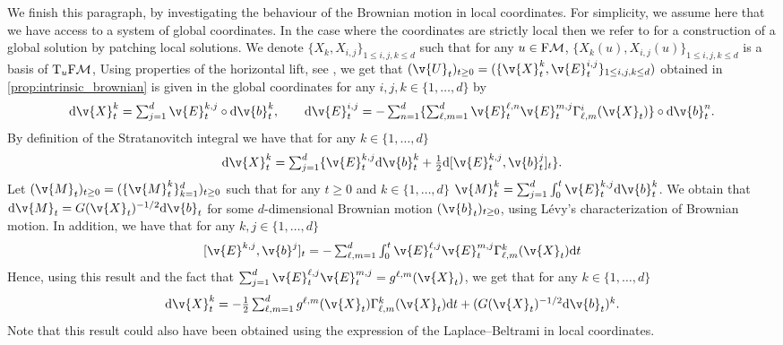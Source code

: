 We finish this paragraph, by investigating the behaviour of the Brownian motion in local coordinates.
For simplicity, we assume here that we have access to a system of global coordinates.
In the case where the coordinates are strictly local then we refer to \textcite[Chapter 5, Theorem 1]{ikeda1989sto} for a construction of a global solution by patching local solutions.
We denote $\{X_k, X_{i,j}\}_{1 \leq i,j,k \leq d}$ such that for any $u \in \mathrm{F}\mathcal{M}$, $\{X_k(u), X_{i,j}(u)\}_{1 \leq i,j,k \leq d}$ is a basis of $\mathrm{T}_u \mathrm{F}\mathcal{M}$, Using properties of the horizontal lift, see \cite[Chapter 2]{hsu2002stochastic}, we get that $(\v{U}_t)_{t \geq 0} = (\{\v{X}^k_t, \v{E}_t^{i,j}\}_{1 \leq i,j,k \leq d})$ obtained in \cref{prop:intrinsic_brownian} is given in the global coordinates for any $i,j,k \in \{1, \dots, d\}$ by \begin{equation} \textstyle{ \mathrm{d} \v{X}_t^k = \sum_{j=1}^d \v{E}_t^{k,j} \circ \mathrm{d} \v{b}_t^k , \qquad \mathrm{d} \v{E}_t^{i,j} = - \sum_{n=1}^d \{\sum_{\ell, m=1}^d \v{E}_t^{\ell,n}\v{E}_t^{m,j} \Gamma_{\ell,m}^{i}(\v{X}_t)\} \circ \mathrm{d} \v{b}_t^n .
	}
\end{equation}
By definition of the Stratanovitch integral we have that for any $k \in \{1, \dots, d\}$ \begin{equation} \textstyle{ \mathrm{d} \v{X}_t^k = \sum_{j=1}^d \{ \v{E}_t^{k,j} \mathrm{d} \v{b}_t^k +\tfrac{1}{2} \mathrm{d} [\v{E}_t^{k,j}, \v{b}_t^j]_t \} .
	}
\end{equation}
Let $(\v{M}_t)_{t \geq 0} = (\{\v{M}_t^k\}_{k=1}^d)_{t \geq 0}$ such that for any $t \geq 0$ and $k \in \{1, \dots, d\}$ $\v{M}_t^k = \sum_{j=1}^d \int_0^t \v{E}_t^{k,j} \mathrm{d} \v{b}_t^k$.
We obtain that $\mathrm{d} \v{M}_t = G(\v{X}_t)^{-1/2} \mathrm{d} \v{b}_t$ for some $d$-dimensional Brownian motion $(\v{b}_t)_{t \geq 0}$, using L\'evy's characterization of Brownian motion.
In addition, we have that for any $k, j \in \{1, \dots, d\}$ \begin{equation} \textstyle{[\v{E}^{k,j}, \v{b}^j]_t = -\sum_{\ell, m=1}^d \int_0^t \v{E}_t^{\ell, j} \v{E}_t^{m,j} \Gamma_{\ell, m}^k(\v{X}_t) \mathrm{d} t } \end{equation} Hence, using this result and the fact that $\sum_{j=1}^d \v{E}_t^{\ell, j} \v{E}_t^{m,j} = g^{\ell,m}(\v{X}_t)$, we get that for any $k \in \{1, \dots, d\}$ \begin{equation} \textstyle{\mathrm{d} \v{X}_t^k =- \tfrac{1}{2} \sum_{\ell, m=1}^d g^{\ell,m}(\v{X}_t) \Gamma_{\ell, m}^k(\v{X}_t) \mathrm{d} t + (G(\v{X}_t)^{-1/2} \mathrm{d} \v{b}_t)^k .
	}
\end{equation}
Note that this result could also have been obtained using the expression of the Laplace--Beltrami in local coordinates.

